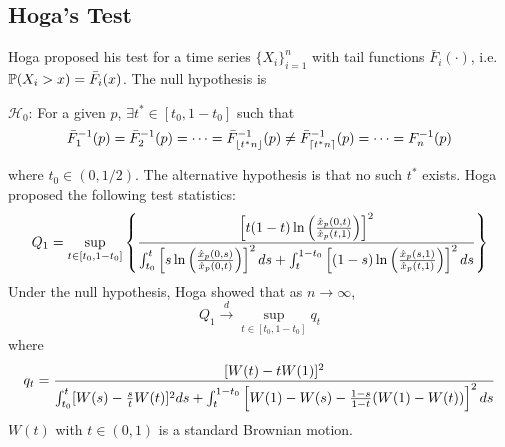 \documentclass{article}
\begin{document}




\subsection{Hoga's Test}
\label{sec:Hoga}

Hoga \cite{Hoga2017} proposed his test for a time series
$\{X_i\}_{i=1}^n$ with tail functions
$\bar F_i(\cdot)$, i.e. $\P(X_i > x) = \bar F_i(x)$. The null
hypothesis is
\begin{hypothesis}
  $\mathcal H_0$: For a given $p$, $\exists t^* \in [t_0, 1 - t_0]$
  such that
  \[
  \bar F_1^{-1}(p) = \bar F_2^{-1}(p) = \cdots =
  \bar F_{\floor{t^* n}}^{-1}(p) \neq
  \bar F_{\ceil{t^* n}}^{-1}(p) = \cdots = F_n^{-1}(p)
  \]
\end{hypothesis}
where $t_0 \in (0, 1/2)$. The alternative hypothesis is that no such
$t^*$ exists. Hoga proposed the following test statistics:
\[
Q_1 = \sup_{t \in [t_0, 1 - t_0]}
\left\{
  {
    \left[
      t (1 - t) \ln\left(
      \hat x_p(0, t)
      \over
      \hat x_p(t, 1)
      \right)
    \right]^2
    \over
    \int_{t_0}^t
    \left[
      s \ln \left(
      \hat x_p(0, s)
      \over
      \hat x_p(0, t)
      \right)
    \right]^2 ds
    +
    \int_{t}^{1 - t_0}
    \left[
      (1 - s) \ln \left(
      \hat x_p(s, 1)
      \over
      \hat x_p(t, 1)
      \right)
    \right]^2 ds
  }
\right\}
\]
Under the null hypothesis, Hoga showed that as $n \to \infty$,
\begin{equation}
  \label{eq:Q1_distr}
  Q_1 \overset{d}{\to}
  \sup_{t \in [t_0, 1 - t_0]} q_t
\end{equation}
where
\[
q_t = 
  {
    [W(t) - t W(1)]^2
    \over
    \int_{t_0}^t [W(s) - {s \over t}W(t)]^2 ds
    +
    \int_{t}^{1 - t_0}
    \left[
      W(1) - W(s) - {1 - s \over 1 - t}
      (W(1) - W(t))
      \right]^2 ds
  }
\]
$W(t)$ with $t \in (0, 1)$ is a standard Brownian motion.
\end{document}

